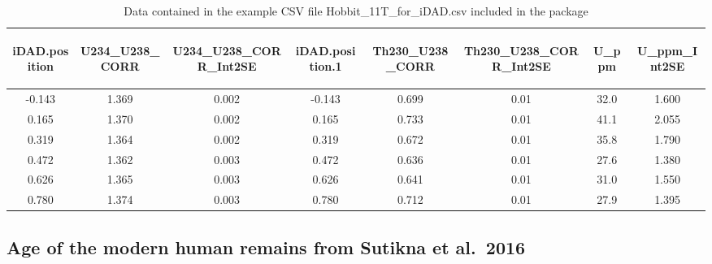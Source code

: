 \documentclass[]{elsarticle} %
\begin{document}
\begin{table}[ht]
\centering
\begin{tabular}{cccccccc}
  \hline
\begin{sideways} iDAD.position \end{sideways} & \begin{sideways} U234\_U238\_CORR \end{sideways} & \begin{sideways} U234\_U238\_CORR\_Int2SE \end{sideways} & \begin{sideways} iDAD.position.1 \end{sideways} & \begin{sideways} Th230\_U238\_CORR \end{sideways} & \begin{sideways} Th230\_U238\_CORR\_Int2SE \end{sideways} & \begin{sideways} U\_ppm \end{sideways} & \begin{sideways} U\_ppm\_Int2SE \end{sideways} \\ 
  \hline
-0.143 & 1.369 & 0.002 & -0.143 & 0.699 & 0.01 & 32.0 & 1.600 \\ 
  0.165 & 1.370 & 0.002 & 0.165 & 0.733 & 0.01 & 41.1 & 2.055 \\ 
  0.319 & 1.364 & 0.002 & 0.319 & 0.672 & 0.01 & 35.8 & 1.790 \\ 
  0.472 & 1.362 & 0.003 & 0.472 & 0.636 & 0.01 & 27.6 & 1.380 \\ 
  0.626 & 1.365 & 0.003 & 0.626 & 0.641 & 0.01 & 31.0 & 1.550 \\ 
  0.780 & 1.374 & 0.003 & 0.780 & 0.712 & 0.01 & 27.9 & 1.395 \\ 
   \hline
\end{tabular}
\caption{\label{tab:table-human}Data contained in the example CSV file Hobbit\_1\-1T\_for\_iDAD.csv included in the package} 
\end{table}

\hypertarget{age-of-the-modern-human-remains-from-sutikna-et-al.2016}{%
\subsection{Age of the modern human remains from Sutikna et al.~2016}\label{age-of-the-modern-human-remains-from-sutikna-et-al.2016}}
\end{document}
